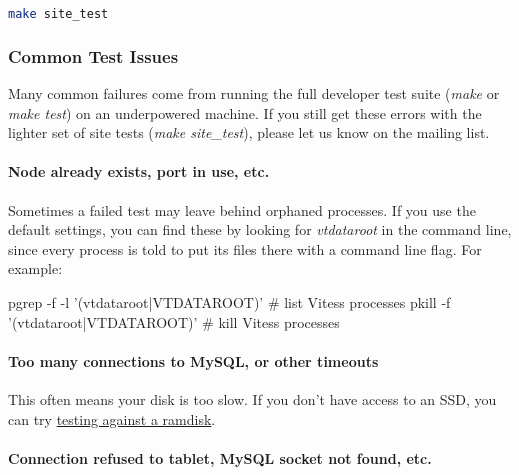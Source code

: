 \begin{lstlisting}[language=Bash]
make site_test
\end{lstlisting}

\subsubsection{Common Test Issues}\hypertarget{common-test-issues}{}\label{common-test-issues}

Many common failures come from running the full developer test suite
(\emph{make} or \emph{make test}) on an underpowered machine. If you still get
these errors with the lighter set of site tests (\emph{make site\_test}),
please let us know on the mailing list.

\paragraph{Node already exists, port in use, etc.}\hypertarget{node-already-exists-port-in-use-etc}{}\label{node-already-exists-port-in-use-etc}

Sometimes a failed test may leave behind orphaned processes.
If you use the default settings, you can find these by looking for
\emph{vtdataroot} in the command line, since every process is told to put
its files there with a command line flag. For example:
\begin{codesample4}
    pgrep -f -l '(vtdataroot|VTDATAROOT)' # list Vitess processes
    pkill -f '(vtdataroot|VTDATAROOT)'    # kill Vitess processes
\end{codesample4}


\paragraph{Too many connections to MySQL, or other timeouts}\hypertarget{too-many-connections-to-mysql-or-other-timeouts}{}\label{too-many-connections-to-mysql-or-other-timeouts}

This often means your disk is too slow. If you don't have access to an SSD,
you can try \href{TestingOnARamDisk.markdown}{testing against a ramdisk}.

\paragraph{Connection refused to tablet, MySQL socket not found, etc.}\hypertarget{connection-refused-to-tablet-mysql-socket-not-found-etc}{}\label{connection-refused-to-tablet-mysql-socket-not-found-etc}

